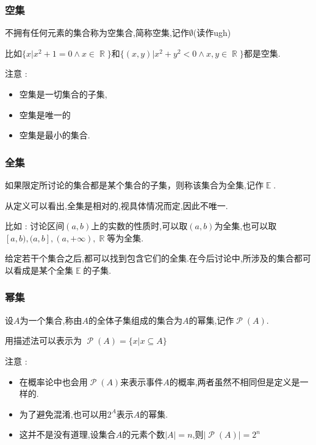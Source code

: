\documentclass[UTF8,12pt]{ctexbook}
\newcommand{\absoluteValue}[1]{\left\lvert #1 \right\vert}
\newcommand{\powerSetOf}[1]{\powerSet (#1)}
\DeclareMathOperator{\mathRealNumberCollection}{\mathbb{R}}
\DeclareMathOperator{\mathEverythingCollection}{\mathbb{E}}
\DeclareMathOperator{\powerSet}{\mathcal{P}}
\begin{document}
{{{{\subsubsection{空集}{
  不拥有任何元素的集合称为空集合,简称空集,记作$\emptyset$(读作ugh)

  比如$\{x | x^2 + 1 = 0 \land x \in \mathRealNumberCollection\}$和$\{(x,y) | x^2+y^2 < 0 \land x,y \in \mathRealNumberCollection\}$都是空集.

  注意 :

  \begin{itemize}
    \item 空集是一切集合的子集,
    \item 空集是唯一的
    \item 空集是最小的集合.
  \end{itemize}
}%

\subsubsection{全集}{
  如果限定所讨论的集合都是某个集合的子集，则称该集合为全集,记作$\mathEverythingCollection$.

  从定义可以看出,全集是相对的,视具体情况而定,因此不唯一.

  比如 : 讨论区间$(a,b)$上的实数的性质时,可以取$(a,b)$为全集,也可以取$[a,b),(a,b],(a , +\infty),\mathRealNumberCollection$等为全集.

  给定若干个集合之后,都可以找到包含它们的全集.在今后讨论中,所涉及的集合都可以看成是某个全集$\mathEverythingCollection$的子集.
}

\subsubsection{幂集}{
  设$A$为一个集合,称由$A$的全体子集组成的集合为$A$的幂集,记作$\powerSetOf{A}$.

  用描述法可以表示为 $\powerSetOf{A} = \{x | x \subseteq A\}$

  注意 :

  \begin{itemize}
    \item 在概率论中也会用$\powerSetOf{A}$来表示事件$A$的概率,两者虽然不相同但是定义是一样的.
    \item 为了避免混淆,也可以用$2^A$表示$A$的幂集.
    \item 这并不是没有道理,设集合$A$的元素个数$\absoluteValue{A} = n$,则$\absoluteValue{\powerSetOf{A}} = 2^n$
  \end{itemize}
}%

}}}}
\end{document}
